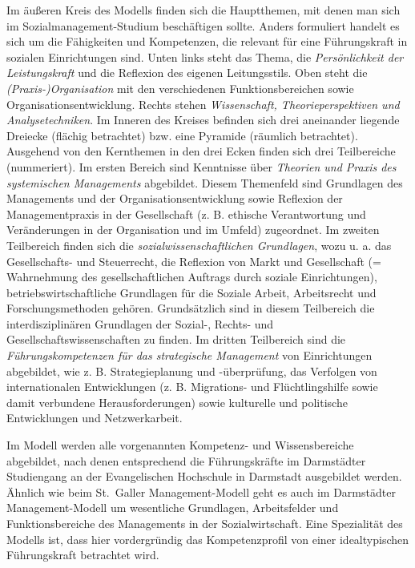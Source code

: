 \documentclass[
  letterpaper,
]{book}
\begin{document}
Im äußeren Kreis des Modells finden sich die Hauptthemen, mit denen man
sich im Sozialmanagement-Studium beschäftigen sollte. Anders formuliert
handelt es sich um die Fähigkeiten und Kompetenzen, die relevant für
eine Führungskraft in sozialen Einrichtungen sind. Unten links steht das
Thema, die \emph{Persönlichkeit der Leistungskraft} und die Reflexion
des eigenen Leitungsstils. Oben steht die \emph{(Praxis-)Organisation}
mit den verschiedenen Funktionsbereichen sowie Organisationsentwicklung.
Rechts stehen \emph{Wissenschaft, Theorieperspektiven und
Analysetechniken}. Im Inneren des Kreises befinden sich drei aneinander
liegende Dreiecke (flächig betrachtet) bzw. eine Pyramide (räumlich
betrachtet). Ausgehend von den Kernthemen in den drei Ecken finden sich
drei Teilbereiche (nummeriert). Im ersten Bereich sind Kenntnisse über
\emph{Theorien und Praxis des systemischen Managements} abgebildet.
Diesem Themenfeld sind Grundlagen des Managements und der
Organisationsentwicklung sowie Reflexion der Managementpraxis in der
Gesellschaft (z. B. ethische Verantwortung und Veränderungen in der
Organisation und im Umfeld) zugeordnet. Im zweiten Teilbereich finden
sich die \emph{sozialwissenschaftlichen Grundlagen}, wozu u. a. das
Gesellschafts- und Steuerrecht, die Reflexion von Markt und Gesellschaft
(= Wahrnehmung des gesellschaftlichen Auftrags durch soziale
Einrichtungen), betriebswirtschaftliche Grundlagen für die Soziale
Arbeit, Arbeitsrecht und Forschungsmethoden gehören. Grundsätzlich sind
in diesem Teilbereich die interdisziplinären Grundlagen der Sozial-,
Rechts- und Gesellschaftswissenschaften zu finden. Im dritten
Teilbereich sind die \emph{Führungskompetenzen für das strategische
Management} von Einrichtungen abgebildet, wie z. B. Strategieplanung und
-überprüfung, das Verfolgen von internationalen Entwicklungen (z. B.
Migrations- und Flüchtlingshilfe sowie damit verbundene
Herausforderungen) sowie kulturelle und politische Entwicklungen und
Netzwerkarbeit.

Im Modell werden alle vorgenannten Kompetenz- und Wissensbereiche
abgebildet, nach denen entsprechend die Führungskräfte im Darmstädter
Studiengang an der Evangelischen Hochschule in Darmstadt ausgebildet
werden. Ähnlich wie beim St.~Galler Management-Modell geht es auch im
Darmstädter Management-Modell um wesentliche Grundlagen, Arbeitsfelder
und Funktionsbereiche des Managements in der Sozialwirtschaft. Eine
Spezialität des Modells ist, dass hier vordergründig das Kompetenzprofil
von einer idealtypischen Führungskraft betrachtet wird.
\end{document}
